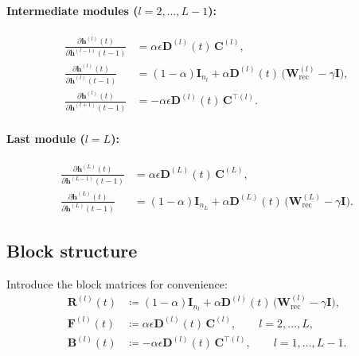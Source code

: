 \paragraph{Intermediate modules ($l=2,\dots,L-1$):}
\begin{align}
\frac{\partial \mathbf{h}^{(l)}(t)}{\partial \mathbf{h}^{(l-1)}(t-1)}
&= \alpha \epsilon \mathbf{D}^{(l)}(t)\, \mathbf{C}^{(l)}, \label{eq:dar-jl-lminus1}\\
\frac{\partial \mathbf{h}^{(l)}(t)}{\partial \mathbf{h}^{(l)}(t-1)}
&= (1-\alpha) \mathbf{I}_{n_l} + \alpha \mathbf{D}^{(l)}(t)\, \big(\mathbf{W}_{\text{rec}}^{(l)} - \gamma \mathbf{I}\big), \label{eq:dar-jll}\\
\frac{\partial \mathbf{h}^{(l)}(t)}{\partial \mathbf{h}^{(l+1)}(t-1)}
&= -\alpha \epsilon \mathbf{D}^{(l)}(t)\, \mathbf{C}^{\top(l)}. \label{eq:dar-jl-lplus1}
\end{align}

\paragraph{Last module ($l=L$):}
\begin{align}
\frac{\partial \mathbf{h}^{(L)}(t)}{\partial \mathbf{h}^{(L-1)}(t-1)}
&= \alpha \epsilon \mathbf{D}^{(L)}(t)\, \mathbf{C}^{(L)}, \label{eq:dar-jL-Lminus1}\\
\frac{\partial \mathbf{h}^{(L)}(t)}{\partial \mathbf{h}^{(L)}(t-1)}
&= (1-\alpha) \mathbf{I}_{n_L} + \alpha \mathbf{D}^{(L)}(t)\, \big(\mathbf{W}_{\text{rec}}^{(L)} - \gamma \mathbf{I}\big). \label{eq:dar-jLL}
\end{align}

\subsection{Block structure}

Introduce the block matrices for convenience:
\begin{align}
\mathbf{R}^{(l)}(t) &\coloneqq (1-\alpha) \mathbf{I}_{n_l} + \alpha \mathbf{D}^{(l)}(t)\, \big(\mathbf{W}_{\text{rec}}^{(l)} - \gamma \mathbf{I}\big), \label{eq:dar-R}\\
\mathbf{F}^{(l)}(t) &\coloneqq \alpha \epsilon \mathbf{D}^{(l)}(t)\, \mathbf{C}^{(l)},\qquad l=2,\dots,L, \label{eq:dar-F}\\
\mathbf{B}^{(l)}(t) &\coloneqq -\alpha \epsilon \mathbf{D}^{(l)}(t)\, \mathbf{C}^{\top(l)},\qquad l=1,\dots,L-1. \label{eq:dar-B}
\end{align}

